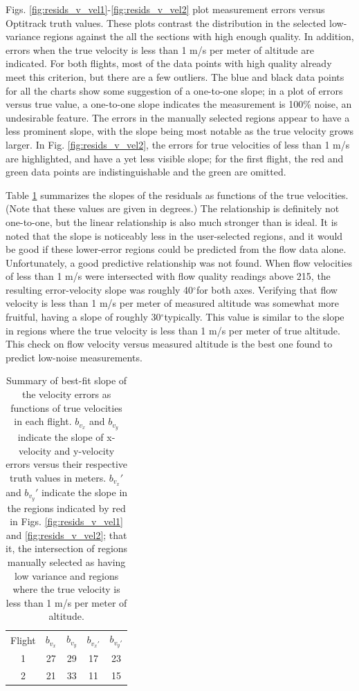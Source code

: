 \documentclass{article}
\newcommand{\degree}{\ensuremath{^\circ}}
\begin{document}
Figs. \ref{fig:resids_v_vel1}-\ref{fig:resids_v_vel2} plot measurement errors versus Optitrack truth values. These plots contrast the distribution in the selected low-variance regions against the all the sections with high enough quality. In addition, errors when the true velocity is less than 1 m/s per meter of altitude are indicated. For both flights, most of the data points with high quality already meet this criterion, but there are a few outliers. The blue and black data points for all the charts show some suggestion of a one-to-one slope; in a plot of errors versus true value, a one-to-one slope indicates the measurement is 100\% noise, an undesirable feature. The errors in the manually selected regions appear to have a less prominent slope, with the slope being most notable as the true velocity grows larger. In Fig. \ref{fig:resids_v_vel2}, the errors for true velocities of less than 1 m/s are highlighted, and have a yet less visible slope; for the first flight, the red and green data points are indistinguishable and the green are omitted.

Table \ref{tab:velvserr} summarizes the slopes of the residuals as functions of the true velocities. (Note that these values are given in degrees.) The relationship is definitely not one-to-one, but the linear relationship is also much stronger than is ideal. It is noted that the slope is noticeably less in the user-selected regions, and it would be good if these lower-error regions could be predicted from the flow data alone. Unfortunately, a good predictive relationship was not found. When flow velocities of less than 1 m/s were intersected with flow quality readings above 215, the resulting error-velocity slope was roughly 40\degree for both axes. Verifying that flow velocity is less than 1 m/s per meter of measured altitude was somewhat more fruitful, having a slope of roughly 30\degree typically. This value is similar to the slope in regions where the true velocity is less than 1 m/s per meter of true altitude. This check on flow velocity versus measured altitude is the best one found to predict low-noise measurements.

\begin{table}
\centering
\begin{tabular}{c|c|c|c|c}
Flight & $b_{v_x}$ & $b_{v_y}$ & $b_{v_x'}$ & $b_{v_y'}$ \\
1 & 27 & 29 & 17 & 23\\
2 & 21 & 33 & 11 & 15\\
\end{tabular}
\caption{Summary of best-fit slope of the velocity errors as functions of true velocities in each flight. $b_{v_x}$ and $b_{v_y}$ indicate the slope of x-velocity and y-velocity errors versus their respective truth values in meters. $b_{v_x}'$ and $b_{v_y}'$ indicate the slope in the regions indicated by red in Figs. \ref{fig:resids_v_vel1} and \ref{fig:resids_v_vel2}; that it, the intersection of regions manually selected as having low variance and regions where the true velocity is less than 1 m/s per meter of altitude.}
\label{tab:velvserr}
\end{table}
\end{document}
